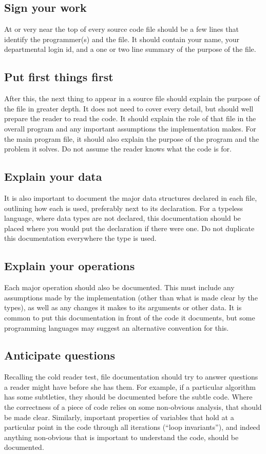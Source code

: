 \documentclass[a4paper]{article}
\begin{document}
\subsection{Sign your work}
At or very near the top of every source code file should be a few lines that
identify the programmer(s) and the file.  It should contain your name, your
departmental login id, and a one or two line summary of the purpose of the
file.

\subsection{Put first things first}
After this, the next thing to appear in a source file should explain the
purpose of the file in greater depth.  It does not need to cover every
detail, but should well prepare the reader to read the code.  It should
explain the role of that file in the overall program and any important
assumptions the implementation makes.  For the main program file, it should
also explain the purpose of the program and the problem it solves.  Do not
assume the reader knows what the code is for.

\subsection{Explain your data}
It is also important to document the major data structures declared in each
file, outlining how each is used, preferably next to its declaration.  For a
typeless language, where data types are not declared, this documentation
should be placed where you would put the declaration if there were one.  Do
not duplicate this documentation everywhere the type is used.

\subsection{Explain your operations}
Each major operation should also be documented.  This must include any
assumptions made by the implementation (other than what is made clear by the
types), as well as any changes it makes to its arguments or other data.  It
is common to put this documentation in front of the code it documents, but
some programming languages may suggest an alternative convention for this.

\subsection{Anticipate questions}
Recalling the cold reader test, file documentation should try to answer
questions a reader might have before she has them.  For example, if a
particular algorithm has some subtleties, they should be documented before
the subtle code.  Where the correctness of a piece of code relies on some
non-obvious analysis, that should be made clear.  Similarly, important
properties of variables that hold at a particular point in the code through
all iterations (``loop invariants''), and indeed anything non-obvious that is
important to understand the code, should be documented.
\end{document}
